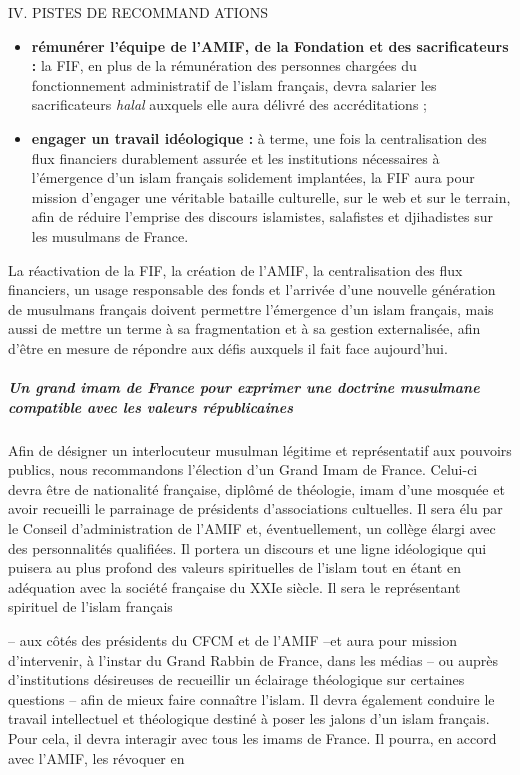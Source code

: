 IV. PISTES DE RECOMMAND ATIONS


\begin{itemize}
\item
  \textbf{rémunérer l'équipe de l'AMIF, de la Fondation et des
  sacrificateurs :} la FIF, en plus de la rémunération des personnes
  chargées du fonctionnement administratif de l'islam français, devra
  salarier les sacrificateurs \emph{halal} auxquels elle aura délivré
  des accréditations ;
\item
  \textbf{engager un travail idéologique :} à terme, une fois la
  centralisation des flux financiers durablement assurée et les
  institutions nécessaires à l'émergence d'un islam français solidement
  implantées, la FIF aura pour mission d'engager une véritable bataille
  culturelle, sur le web et sur le terrain, afin de réduire l'emprise
  des discours islamistes, salafistes et djihadistes sur les musulmans
  de France.
\end{itemize}


La réactivation de la FIF, la création de l'AMIF, la centralisation des
flux financiers, un usage responsable des fonds et l'arrivée d'une
nouvelle génération de musulmans français doivent permettre l'émergence
d'un islam français, mais aussi de mettre un terme à sa fragmentation et
à sa gestion externalisée, afin d'être en mesure de répondre aux défis
auxquels il fait face aujourd'hui.


\hypertarget{un-grand-imam-de-france-pour-exprimer-une-doctrine-musulmane-compatible-avec-les-valeurs-ruxe9publicaines}{%
\subparagraph{Un grand imam de France pour exprimer une doctrine
musulmane compatible avec les valeurs
républicaines}\label{un-grand-imam-de-france-pour-exprimer-une-doctrine-musulmane-compatible-avec-les-valeurs-ruxe9publicaines}}


Afin de désigner un interlocuteur musulman légitime et représentatif aux
pouvoirs publics, nous recommandons l'élection d'un Grand Imam de
France. Celui-ci devra être de nationalité française, diplômé de
théologie, imam d'une mosquée et avoir recueilli le parrainage de
présidents d'associations cultuelles. Il sera élu par le Conseil
d'administration de l'AMIF et, éventuellement, un collège élargi avec
des personnalités qualifiées. Il portera un discours et une ligne
idéologique qui puisera au plus profond des valeurs spirituelles de
l'islam tout en étant en adéquation avec la société française du XXIe
siècle. Il sera le représentant spirituel de l'islam français

-- aux côtés des présidents du CFCM et de l'AMIF --et aura pour mission
d'intervenir, à l'instar du Grand Rabbin de France, dans les médias --
ou auprès d'institutions désireuses de recueillir un éclairage
théologique sur certaines questions -- afin de mieux faire connaître
l'islam. Il devra également conduire le travail intellectuel et
théologique destiné à poser les jalons d'un islam français. Pour cela,
il devra interagir avec tous les imams de France. Il pourra, en accord
avec l'AMIF, les révoquer en



